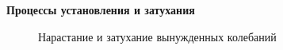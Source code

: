 \documentclass[a4paper,12pt]{article}
\begin{document}
\par \textbf{Процессы установления и затухания} 

\begin{figure}
\caption{Нарастание и затухание вынужденных колебаний}
\end{figure}
\end{document}
